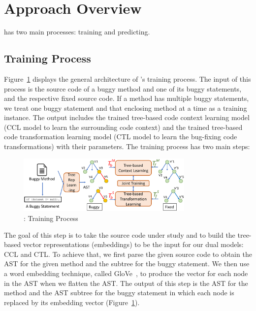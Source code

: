 \section{Approach Overview}
\label{overview:sec}

{\tool} has two main processes: training and predicting.

\subsection{Training Process}

Figure~\ref{overview-training} displays the general architecture of
{\tool}'s training process. The input of this process is the
source code of a buggy method and one of its buggy statements, and the
respective fixed source code. If a method has multiple buggy
statements, we treat one buggy statement and that enclosing method at
a time as a training instance. The output includes the trained
tree-based code context learning model (CCL model to learn the
surrounding code context) and the trained tree-based code
transformation learning model (CTL model to learn the
bug-fixing code transformations) with their parameters. The training
process has two main steps:

\begin{figure}[t]
	\centering
	\includegraphics[width=3.4in]{graphs/overview-training.png}
        \vspace{-15pt}
	\caption{{\tool}: Training Process}
	\label{overview-training}
\end{figure}

\vspace{3pt}
 The goal of this
step is to take the source code under study and to build the
tree-based vector representations (embeddings) to be the input for our
dual models: CCL and CTL. To achieve that, we first parse the given
source code to obtain the AST for the given method and the subtree for
the buggy statement.  We then use a word embedding technique, called
GloVe~\cite{pennington2014glove}, to produce the vector for each node
in the AST when we flatten the AST. The output of this step is the AST
for the method and the AST subtree for the buggy statement in which
each node is replaced by its embedding vector
(Figure~\ref{overview-training}).

